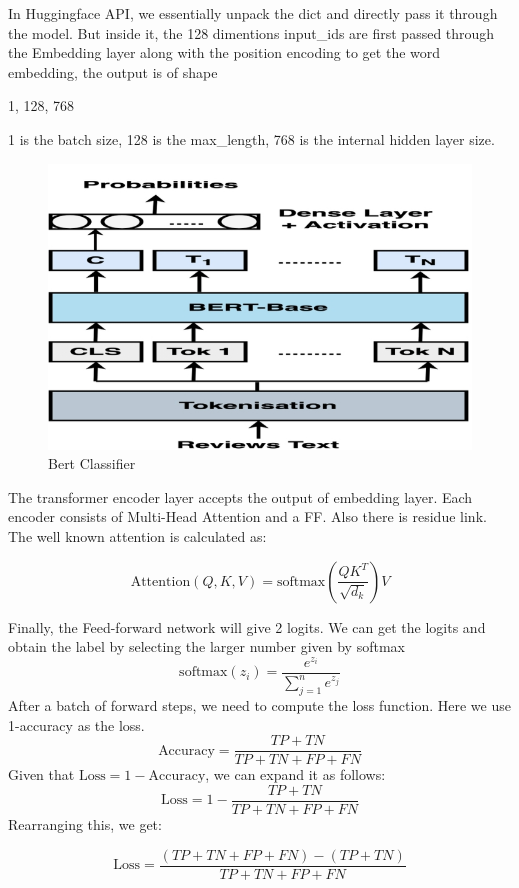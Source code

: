 \documentclass{article}
\begin{document}
In Huggingface API, we essentially unpack the dict and directly pass it through the model. But inside it, the 128 dimentions input\_ids are first passed through the Embedding layer along with the position encoding to get the word embedding, the output is of shape 

\begin{center}
 1, 128, 768  
\end{center}

1 is the batch size, 128 is the max\_length, 768 is the internal hidden layer size. 

\begin{figure}[h]
    \centering
    \includegraphics[width=0.8\linewidth]{bert_finetune.png}
    \caption{Bert Classifier}
    \label{fig:model}
\end{figure}


The transformer encoder layer accepts the output of embedding layer. Each encoder consists of Multi-Head Attention and a FF. Also there is residue link. The well known attention is calculated as: 


\[\text{Attention}(Q, K, V) = \text{softmax}\left(\frac{QK^T}{\sqrt{d_k}}\right) V
\]

Finally, the Feed-forward network will give 2 logits. We can get the logits and obtain the label by selecting the larger number given by softmax \[
\text{softmax}(z_i) = \frac{e^{z_i}}{\sum_{j=1}^n e^{z_j}}
\]
After a batch of forward steps, we need to compute the loss function. Here we use 1-accuracy as the loss. \[
\text{Accuracy} = \frac{TP + TN}{TP + TN + FP + FN}
\]
Given that \(\text{Loss} = 1 - \text{Accuracy}\), we can expand it as follows:
\[
\text{Loss} = 1 - \frac{TP + TN}{TP + TN + FP + FN}
\]
Rearranging this, we get:

\[
\text{Loss} = \frac{(TP + TN + FP + FN) - (TP + TN)}{TP + TN + FP + FN}
\]
\end{document}
